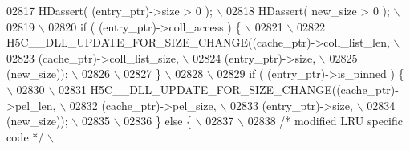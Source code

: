 \begin{DoxyCode}
02817 \textcolor{preprocessor}{    HDassert( (entry\_ptr)->size > 0 );                                    \(\backslash\)}
02818 \textcolor{preprocessor}{    HDassert( new\_size > 0 );                                             \(\backslash\)}
02819 \textcolor{preprocessor}{                                                                          \(\backslash\)}
02820 \textcolor{preprocessor}{    if ( (entry\_ptr)->coll\_access ) \{                                     \(\backslash\)}
02821 \textcolor{preprocessor}{                                                                          \(\backslash\)}
02822 \textcolor{preprocessor}{    H5C\_\_DLL\_UPDATE\_FOR\_SIZE\_CHANGE((cache\_ptr)->coll\_list\_len,       \(\backslash\)}
02823 \textcolor{preprocessor}{                            (cache\_ptr)->coll\_list\_size,      \(\backslash\)}
02824 \textcolor{preprocessor}{                            (entry\_ptr)->size,                \(\backslash\)}
02825 \textcolor{preprocessor}{                    (new\_size));                      \(\backslash\)}
02826 \textcolor{preprocessor}{                                                                      \(\backslash\)}
02827 \textcolor{preprocessor}{    \}                                                                     \(\backslash\)}
02828 \textcolor{preprocessor}{                                                                          \(\backslash\)}
02829 \textcolor{preprocessor}{    if ( (entry\_ptr)->is\_pinned ) \{                                       \(\backslash\)}
02830 \textcolor{preprocessor}{                                                                          \(\backslash\)}
02831 \textcolor{preprocessor}{    H5C\_\_DLL\_UPDATE\_FOR\_SIZE\_CHANGE((cache\_ptr)->pel\_len,             \(\backslash\)}
02832 \textcolor{preprocessor}{                            (cache\_ptr)->pel\_size,            \(\backslash\)}
02833 \textcolor{preprocessor}{                            (entry\_ptr)->size,                \(\backslash\)}
02834 \textcolor{preprocessor}{                    (new\_size));                      \(\backslash\)}
02835 \textcolor{preprocessor}{                                                                      \(\backslash\)}
02836 \textcolor{preprocessor}{    \} else \{                                                              \(\backslash\)}
02837 \textcolor{preprocessor}{                                                                          \(\backslash\)}
02838 \textcolor{preprocessor}{        }\textcolor{comment}{/* modified LRU specific code */}\textcolor{preprocessor}{                                  \(\backslash\)}

\end{DoxyCode}

